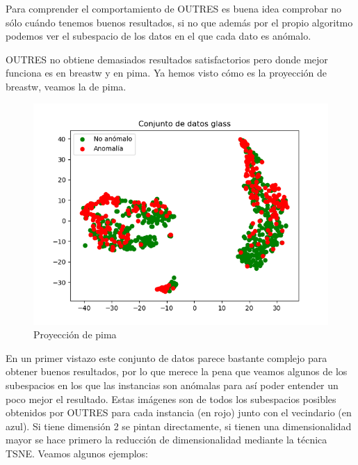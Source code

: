 Para comprender el comportamiento de OUTRES es buena idea comprobar no sólo cuándo tenemos buenos resultados, si no que además por el propio algoritmo podemos ver el subespacio de los datos en el que cada dato es anómalo.

OUTRES no obtiene demasiados resultados satisfactorios pero donde mejor funciona es en breastw y en pima. Ya hemos visto cómo es la proyección de breastw, veamos la de pima.

\begin{figure}[H]
	\centering
	\includegraphics[scale=0.7]{imagenes/pima}
	\caption{Proyección de pima}
	\label{pima}
\end{figure}

En un primer vistazo este conjunto de datos parece bastante complejo para obtener buenos resultados, por lo que merece la pena que veamos algunos de los subespacios en los que las instancias son anómalas para así poder entender un poco mejor el resultado. Estas imágenes son de todos los subespacios posibles obtenidos por OUTRES para cada instancia (en rojo) junto con el vecindario (en azul). Si tiene dimensión 2 se pintan directamente, si tienen una dimensionalidad mayor se hace primero la reducción de dimensionalidad mediante la técnica TSNE. Veamos algunos ejemplos:

